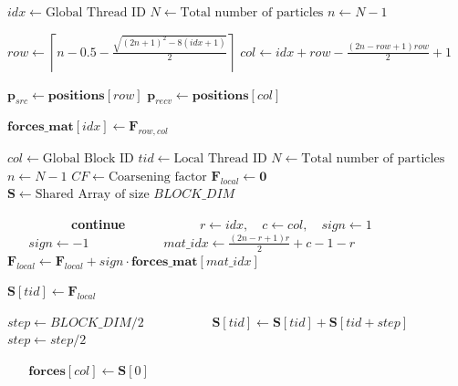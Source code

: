 \documentclass[12pt]{article}
\begin{document}
\begin{algorithm}
\caption{Filling the Explicit Force Matrix} \label{algo:explicitMatrix}
\begin{algorithmic}[1]
\State $idx \gets \text{Global Thread ID}$
\State $N \gets \text{Total number of particles}$
\State $n \gets N - 1$ 

\State $row \gets \left\lceil n - 0.5 - \frac{\sqrt{(2n+1)^2 - 8(idx+1)}}{2} \right\rceil$
\State $col \gets idx + row - \frac{(2n-row+1)row}{2} + 1$

\State $\mathbf{p}_{src} \gets \mathbf{positions}[row]$ 
\State $\mathbf{p}_{recv} \gets \mathbf{positions}[col]$ 

\State $\mathbf{forces\_mat}[idx] \gets \mathbf{F}_{row,col}$
\end{algorithmic}
\end{algorithm}

\begin{algorithm}
\caption{Explicit Matrix Reduction} \label{algo:matrixReduction}
\begin{algorithmic}[1]
\State $col \gets \text{Global Block ID}$ 
\State $tid \gets \text{Local Thread ID}$
\State $N \gets \text{Total number of particles}$
\State $n \gets N - 1$
\State $CF \gets \text{Coarsening factor}$
\State $\mathbf{F}_{local} \gets \mathbf{0}$ 
\State $\mathbf{S} \gets \text{Shared Array of size } BLOCK\_DIM$ 

        \State \textbf{continue}
    \EndIf
    
    \State $r \gets idx, \quad c \gets col, \quad sign \gets 1$
        \State {}
        \State $sign \gets -1$
    \EndIf
    
    \State $mat\_idx \gets \frac{(2n - r + 1)r}{2} + c - 1 - r$ 
    \State $\mathbf{F}_{local} \gets \mathbf{F}_{local} + sign \cdot \mathbf{forces\_mat}[mat\_idx]$
\EndFor

\State $\mathbf{S}[tid] \gets \mathbf{F}_{local}$
\State {}

\State $step \gets BLOCK\_DIM / 2$
        \State $\mathbf{S}[tid] \gets \mathbf{S}[tid] + \mathbf{S}[tid + step]$
    \EndIf
    \State $step \gets step / 2$
    \State {}
\EndWhile

    \State $\mathbf{forces}[col] \gets \mathbf{S}[0]$
\EndIf
\end{algorithmic}
\end{algorithm}
\end{document}
